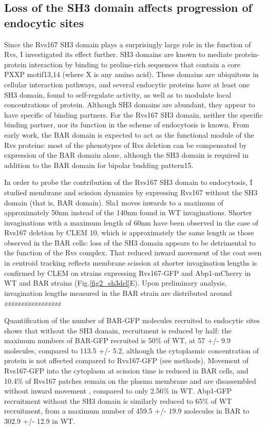 	\subsection{Loss of the SH3 domain affects progression of \\endocytic sites}
Since the Rvs167 SH3 domain plays a surprisingly large role in the function of Rvs, I investigated its effect further. SH3 domains are known to mediate protein-protein interaction by binding to proline-rich sequences that contain a core PXXP motif13,14 (where X is any amino acid). These domains are ubiquitous in cellular interaction pathways, and several endocytic proteins have at least one SH3 domain, found to self-regulate activity, as well as to modulate local concentrations of protein. Although SH3 domains are abundant, they appear to have specific of binding partners. For the Rvs167 SH3 domain, neither the specific binding partner, nor its function in the scheme of endocytosis is known. From early work, the BAR domain is expected to act as the functional module of the Rvs proteins: most of the phenotypes of Rvs deletion can be compensated by expression of the BAR domain alone, although the SH3 domain is required in addition to the BAR domain for bipolar budding pattern15. 

	\vspace{5mm}
In order to probe the contribution of the Rvs167 SH3 domain to endocytosis, I studied membrane and scission dynamics by expressing Rvs167 without the SH3 domain (that is, BAR domain). Sla1 moves inwards to a maximum of approximately 50nm instead of the 140nm found in WT invaginations. Shorter invaginations with a maximum length of 60nm have been observed in the case of Rvs167 deletion by CLEM 10, which is approximately the same length as those observed in the BAR cells: loss of the SH3 domain appears to be detrimental to the function of the Rvs complex. That reduced inward movement of the coat seen in centroid tracking reflects membrane scission at shorter invagination lengths is confirmed by CLEM on strains expressing Rvs167-GFP and Abp1-mCherry in WT and BAR strains (Fig.\ref{fig2_sh3del}E). Upon preliminary analysis, invagination lengths measured in the BAR strain are distributed around \textit{xxxxxxxxxxxxxxxxx}

	\vspace{5mm}
Quantification of the number of BAR-GFP molecules recruited to endocytic sites shows that without the SH3 domain, recruitment is reduced by half: the maximum numbers of BAR-GFP recruited is 50\% of WT, at 57 +/- 9.9 molecules, compared to 113.5 +/- 5.2, although the cytoplasmic concentration of protein is not affected compared to Rvs167-GFP (see methods). Movement of Rvs167-GFP into the cytoplasm at scission time is reduced in BAR cells, and 10.4\% of Rvs167 patches remain on the plasma membrane and are disassembled without inward movement , compared to only 2.56\% in WT.  Abp1-GFP recruitment without the SH3 domain is similarly reduced to 65\% of WT recruitment, from a maximum number of 459.5 +/- 19.9 molecules in BAR to 302.9 +/- 12.9 in WT. 

